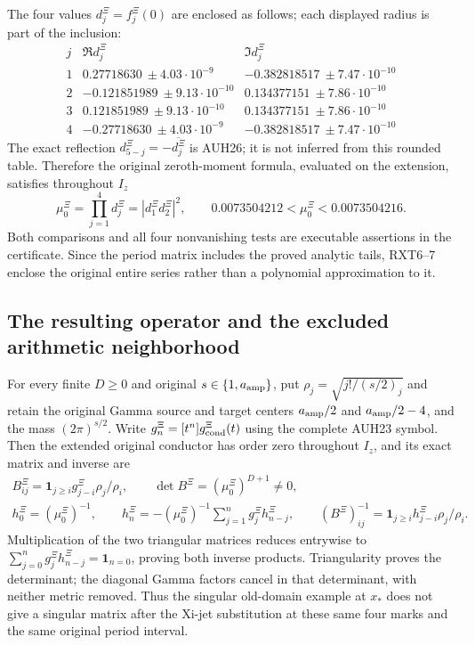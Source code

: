 The four values $d_j^\Xi=f_j^\Xi(0)$ are enclosed as follows;
each displayed radius is part of the inclusion:
\[
\begin{array}{c|c|c}
 j&\Re d_j^\Xi&\Im d_j^\Xi\\\hline
 1&0.27718630\ \pm4.03\cdot10^{-9}
      &-0.382818517\ \pm7.47\cdot10^{-10}\\
 2&-0.121851989\ \pm9.13\cdot10^{-10}
      &0.134377151\ \pm7.86\cdot10^{-10}\\
 3&0.121851989\ \pm9.13\cdot10^{-10}
      &0.134377151\ \pm7.86\cdot10^{-10}\\
 4&-0.27718630\ \pm4.03\cdot10^{-9}
      &-0.382818517\ \pm7.47\cdot10^{-10}
\end{array}\tag{RXT6}
\]
The exact reflection $d_{5-j}^\Xi=-\overline{d_j^\Xi}$
is AUH26; it is not inferred from this rounded table. Therefore
the original zeroth-moment formula, evaluated on the extension,
satisfies throughout $I_z$
\[
 \mu_0^\Xi=\prod_{j=1}^4d_j^\Xi
           =|d_1^\Xi d_2^\Xi|^2,\qquad
 0.0073504212<\mu_0^\Xi<0.0073504216.
 \tag{RXT7}
\]
Both comparisons and all four nonvanishing tests are executable
assertions in the certificate. Since the period matrix includes
the proved analytic tails, RXT6--7 enclose the original entire
series rather than a polynomial approximation to it.

\subsection{The resulting operator and the excluded arithmetic neighborhood}

For every finite $D\ge0$ and original $s\in\{1,a_{\rm amp}\}$,
put $\rho_j=\sqrt{j!/(s/2)_j}$ and retain the original Gamma
source and target centers $a_{\rm amp}/2$ and
$a_{\rm amp}/2-4$, and the mass $(2\pi)^{s/2}$.
Write $g_n^\Xi=[t^n]g_{\rm cond}^\Xi(t)$ using the complete
AUH23 symbol. Then the extended original conductor has order zero
throughout $I_z$, and its exact matrix and inverse are
\[
\begin{gathered}
 B_{ij}^\Xi=\boldsymbol1_{j\ge i}g_{j-i}^\Xi\rho_j/\rho_i,
 \qquad \det B^\Xi=(\mu_0^\Xi)^{D+1}\ne0,\\
 h_0^\Xi=(\mu_0^\Xi)^{-1},\qquad
 h_n^\Xi=-(\mu_0^\Xi)^{-1}\sum_{j=1}^n g_j^\Xi h_{n-j}^\Xi,
 \qquad (B^\Xi)^{-1}_{ij}
 =\boldsymbol1_{j\ge i}h_{j-i}^\Xi\rho_j/\rho_i.
\end{gathered}\tag{RXT8}
\]
Multiplication of the two triangular matrices reduces entrywise
to $\sum_{j=0}^ng_j^\Xi h_{n-j}^\Xi=\boldsymbol1_{n=0}$,
proving both inverse products. Triangularity proves the determinant;
the diagonal Gamma factors cancel in that determinant, with neither
metric removed. Thus the singular old-domain example at $x_*$
does not give a singular matrix after the Xi-jet substitution at
these same four marks and the same original period interval.

